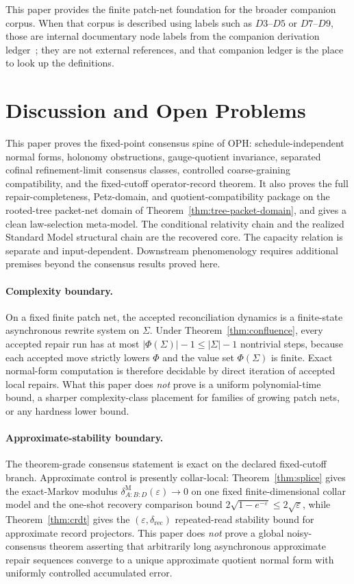 \documentclass[11pt]{article}
\theoremstyle{remark}
\theoremstyle{plain}
\begin{document}
This paper provides the finite patch-net foundation for the broader companion corpus. When that
corpus is described using labels such as \(D3\)--\(D5\) or \(D7\)--\(D9\), those are internal
documentary node labels from the companion derivation ledger~\cite{OPH}; they are not external
references, and that companion ledger is the place to look up the definitions.


\section{Discussion and Open Problems}

This paper proves the fixed-point consensus spine of OPH: schedule-independent normal forms,
holonomy obstructions, gauge-quotient invariance, separated cofinal refinement-limit consensus
classes, controlled coarse-graining compatibility, and the fixed-cutoff operator-record theorem.
It also proves the full repair-completeness, Petz-domain, and quotient-compatibility package on
the rooted-tree packet-net domain of Theorem~\ref{thm:tree-packet-domain}, and gives a clean
law-selection meta-model. The conditional relativity chain and the realized Standard Model
structural chain are the recovered core. The capacity relation is separate and input-dependent.
Downstream phenomenology requires additional premises beyond the consensus results proved here.

\paragraph{Complexity boundary.}
On a fixed finite patch net, the accepted reconciliation dynamics is a finite-state asynchronous
rewrite system on \(\Sigma\). Under Theorem~\ref{thm:confluence}, every accepted repair run has at
most \(|\Phi(\Sigma)|-1\le |\Sigma|-1\) nontrivial steps, because each accepted move strictly
lowers \(\Phi\) and the value set \(\Phi(\Sigma)\) is finite. Exact normal-form computation is
therefore decidable by direct iteration of accepted local repairs. What this paper does
\emph{not} prove is a uniform polynomial-time bound, a sharper complexity-class placement for
families of growing patch nets, or any hardness lower bound.

\paragraph{Approximate-stability boundary.}
The theorem-grade consensus statement is exact on the declared fixed-cutoff branch. Approximate
control is presently collar-local: Theorem~\ref{thm:splice} gives the exact-Markov modulus
\(\delta^{\mathrm M}_{A:B:D}(\varepsilon)\to0\) on one fixed finite-dimensional collar model and
the one-shot recovery comparison bound \(2\sqrt{1-e^{-\varepsilon}}\le 2\sqrt{\varepsilon}\),
while Theorem~\ref{thm:crdt} gives the \((\varepsilon,\delta_{\mathrm{rec}})\) repeated-read
stability bound for approximate record projectors. This paper does \emph{not} prove a
global noisy-consensus theorem asserting that arbitrarily long asynchronous approximate repair
sequences converge to a unique approximate quotient normal form with uniformly controlled
accumulated error.
\end{document}
